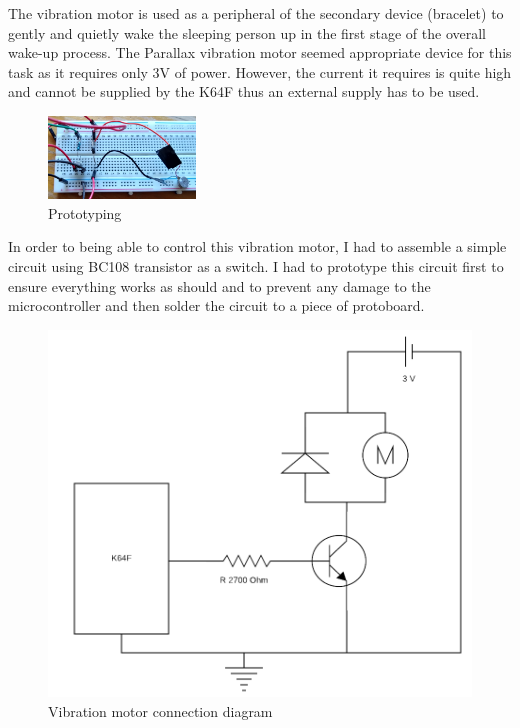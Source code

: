 \documentclass[12pt,a4paper]{article}
\begin{document}
		The vibration motor is used as a peripheral of the secondary device (bracelet) to gently and quietly wake the sleeping person up in the first stage of the overall wake-up process. The Parallax vibration motor seemed appropriate device for this task as it requires only 3V of power. However, the current it requires is quite high and cannot be supplied by the K64F thus an external supply has to be used.\\
		
		
        \begin{figure}
         \centering
         \includegraphics[width=0.35\textwidth]{circuit_proto.jpg}
         \caption{Prototyping}
        \end{figure}
        
        In order to being able to control this vibration motor, I had to assemble a simple circuit using BC108 transistor as a switch. I had to prototype this circuit first to ensure everything works as should and to prevent any damage to the microcontroller and then solder the circuit to a piece of protoboard.\\
        
		\begin{figure}[h]
			\centering
			\includegraphics[scale=0.3]{motor_diag1.png}
			\caption{Vibration motor connection diagram}
		\end{figure}
        
\end{document}
